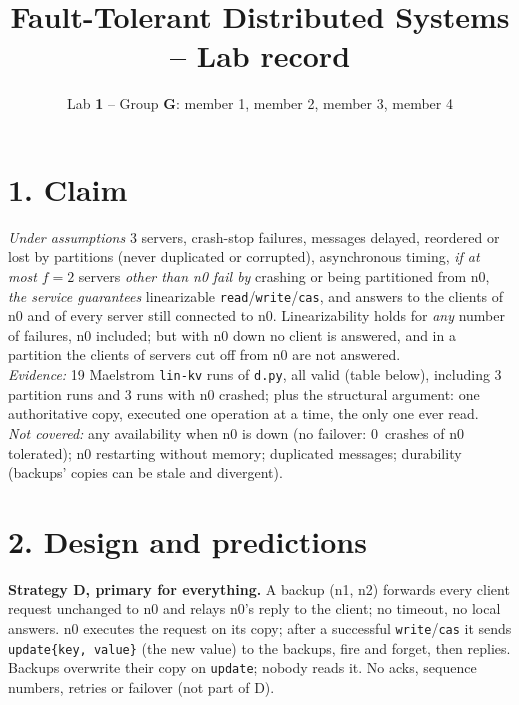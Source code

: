 \documentclass[a4paper,10pt]{article}
\title{Fault-Tolerant Distributed Systems -- Lab record}
\author{Lab \textbf{1} -- Group \textbf{G}: member 1, member 2, member 3, member 4}
\date{}
\begin{document}
\maketitle
\vspace{-3em}

\section*{1. Claim}

\noindent\emph{Under assumptions} 3 servers, crash-stop failures, messages
delayed, reordered or lost by partitions (never duplicated or corrupted),
asynchronous timing, \emph{if at most} $f=2$ servers \emph{other than n0}
\emph{fail by} crashing or being partitioned from n0, \emph{the service
guarantees} linearizable \texttt{read}/\texttt{write}/\texttt{cas}, and
answers to the clients of n0 and of every server still connected to n0.
Linearizability holds for \emph{any} number of failures, n0 included; but
with n0 down no client is answered, and in a partition the clients of
servers cut off from n0 are not answered.\\
\emph{Evidence:} 19 Maelstrom \texttt{lin-kv} runs of \texttt{d.py}, all
valid (table below), including 3 partition runs and 3 runs with n0 crashed;
plus the structural argument: one authoritative copy, executed one
operation at a time, the only one ever read.\\
\emph{Not covered:} any availability when n0 is down (no failover:
0~crashes of n0 tolerated); n0 restarting without memory; duplicated
messages; durability (backups' copies can be stale and divergent).

\section*{2. Design and predictions}

\textbf{Strategy D, primary for everything.} A backup (n1, n2) forwards
every client request unchanged to n0 and relays n0's reply to the client;
no timeout, no local answers. n0 executes the request on its copy; after a
successful \texttt{write}/\texttt{cas} it sends \texttt{update\{key,
value\}} (the new value) to the backups, fire and forget, then replies.
Backups overwrite their copy on \texttt{update}; nobody reads it. No acks,
sequence numbers, retries or failover (not part of D).
\end{document}
